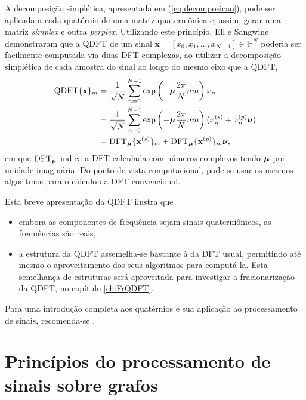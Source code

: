 A decomposi\c c\~ao simpl\'etica, apresentada em (\ref{eq:decomposicao}), pode ser aplicada a cada quat\'ernio de uma matriz quaterni\^onica e, assim, gerar uma matriz \emph{simplex} e outra \emph{perplex}. Utilizando este princ\'ipio, Ell e Sangwine \cite{ell2014quaternion} demonstraram que a QDFT de um sinal $ \mathbf{x} = [x_0, x_1, \dots, x_{N-1}] \in \mathbb{H}^N $ poderia ser facilmente computada via duas DFT complexas, ao utilizar a decomposi\c c\~ao simpl\'etica de cada amostra do sinal ao longo do mesmo eixo que a QDFT,
\begin{equation}
\begin{aligned}
\text{QDFT}\{ \mathbf{x} \}_m &= \frac{1}{\sqrt{N}} \sum_{n=0}^{N-1} \exp \left( -\boldsymbol{\mu} \frac{2\pi}{N} nm \right) x_n \\
&= \frac{1}{\sqrt{N}} \sum_{n=0}^{N-1} \exp \left( -\boldsymbol{\mu} \frac{2\pi}{N} nm \right) (x_n^{(s)} + x_n^{(p)}\boldsymbol{\nu}) \\
&= \text{DFT}_{\boldsymbol{\mu}}\{ \mathbf{x}^{(s)} \}_m +
\text{DFT}_{\boldsymbol{\mu}}\{ \mathbf{x}^{(p)} \}_m \boldsymbol{\nu},
\end{aligned}
\end{equation}
em que $ \text{DFT}_{\boldsymbol{\mu}} $ indica a DFT calculada com n\'umeros complexos tendo $ \boldsymbol{\mu} $ por unidade imagin\'aria. Do ponto de vista computacional, pode-se usar os mesmos algoritmos para o c\'alculo da DFT convencional.

Esta breve apresenta\c c\~ao da QDFT ilustra que
\begin{itemize}[noitemsep]
\item embora as componentes de frequ\^encia sejam sinais quaterni\^onicos, as frequ\^encias s\~ao reais,
\item a estrutura da QDFT assemelha-se bastante \`a da DFT usual, permitindo at\'e mesmo o aproveitamento dos seus algoritmos para comput\'a-la. Esta semelhan\c ca de estruturas ser\'a aproveitada para investigar a fracionariza\c c\~ao da QDFT, no cap\'itulo \ref{ch:FrQDFT}.
\end{itemize}

Para uma introdu\c c\~ao completa aos quat\'ernios e sua aplica\c c\~ao ao processamento de sinais, recomenda-se \cite{zhang1997quaternions,ell2014quaternion,flamant2017time, jiang2014general}.

\section{Princ\'ipios do processamento de sinais sobre grafos}
\label{sec:GSPintro}

